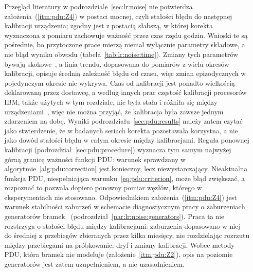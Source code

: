 Przegląd literatury w podrozdziale~\ref{sec:lr:noise} nie potwierdza założenia~(\ref{itm:pdu:Z4}) w postaci mocnej, czyli stałości błędu do następnej kalibracji urządzenia; zgodny jest z postacią słabszą, w której korekta wyznaczona z pomiaru zachowuje ważność przez czas rzędu godzin.
Wnioski te są pośrednie, bo przytoczone prace mierzą niemal wyłącznie parametry składowe, a nie błąd wyniku obwodu (tabela~\ref{tab:lr:noise:time}).
Zmiany tych parametrów bywają skokowe~\cite{klimov_fluctuations_2018,burnett_decoherence_2019}, a linia trendu, dopasowana do pomiarów z wielu okresów kalibracji, opisuje średnią zależność błędu od czasu, więc zmian epizodycznych w pojedynczym okresie nie wykrywa.
Czas od kalibracji jest ponadto wielkością deklarowaną przez dostawcę, a według innych prac częstość kalibracji procesorów IBM, także użytych w tym rozdziale, nie była stała i różniła się między urządzeniami~\cite{wilson_just-in-time_2020,etxezarreta_multiqubit_2023}, więc nie można przyjąć, że kalibracja była zawsze jednym zdarzeniem na dobę.
Wyniki podrozdziału~\ref{sec:pdu:results} należy zatem czytać jako stwierdzenie, że w badanych seriach korekta pozostawała korzystna, a nie jako dowód stałości błędu w całym okresie między kalibracjami.
Reguła ponownej kalibracji (podrozdział~\ref{sec:pdu:procedure}) wyznacza tym samym najwyżej górną granicę ważności funkcji PDU: warunek sprawdzany w algorytmie~\ref{alg:pdu:correction} jest konieczny, lecz niewystarczający.
Nieaktualna funkcja PDU, niespełniająca warunku~\eqref{eq:pdu:criterion}, może błąd zwiększać, a rozpoznać to pozwala dopiero ponowny pomiar węzłów, którego w eksperymentach nie stosowano.
Odpowiednikiem założenia~(\ref{itm:pdu:Z4}) jest warunek stabilności zaburzeń w schemacie diagnostycznym pracy o zaburzeniach generatorów bramek~\cite{raubitzek_quantum_noise} (podrozdział~\ref{par:lr:noise:generators}).
Praca ta nie rozstrzyga o stałości błędu między kalibracjami: zaburzenia dopasowano w niej do średniej z przebiegów zbieranych przez kilka miesięcy, nie rozdzielając rozrzutu między przebiegami na próbkowanie, dryf i zmiany kalibracji.
Wobec metody PDU, która bramek nie modeluje (założenie~\ref{itm:pdu:Z2}), opis na poziomie generatorów jest zatem uzupełnieniem, a nie uzasadnieniem.

